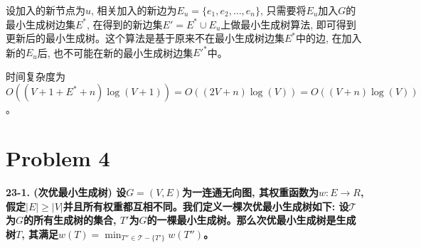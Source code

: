 \documentclass[paper=a4, fontsize=11pt]{scrartcl} %
\numberwithin{equation}{section} %
\numberwithin{figure}{section} %
\numberwithin{table}{section} %
\begin{document}
设加入的新节点为$u$, 相关加入的新边为$E_u = \{e_1, e_2, \dots, e_n\}$, 只需要将$E_u$加入$G$的最小生成树边集$E^{*}$, 在得到的新边集$E' = E^{*} \cup E_u$上做最小生成树算法, 即可得到更新后的最小生成树。这个算法是基于原来不在最小生成树边集$E^{*}$中的边, 在加入新的$E_u$后, 也不可能在新的最小生成树边集$E'^{*}$中。


时间复杂度为$O((V+1+E^{*}+n) \log(V+1)) = O((2V + n)\log(V)) = O((V+n)\log(V))$。

\section{Problem 4}
\textbf{23-1. (次优最小生成树) 设$G = (V, E)$为一连通无向图, 其权重函数为$w: E \rightarrow R$, 假定$|E| \geq |V|$并且所有权重都互相不同。我们定义一棵次优最小生成树如下: 设$\mathscr{T}$为$G$的所有生成树的集合, $T'$为$G$的一棵最小生成树。那么次优最小生成树是生成树$T$, 其满足$w(T) = \min_{T'' \in \mathscr{T} - \{T'\}} {w(T'')}$。}
\end{document}
